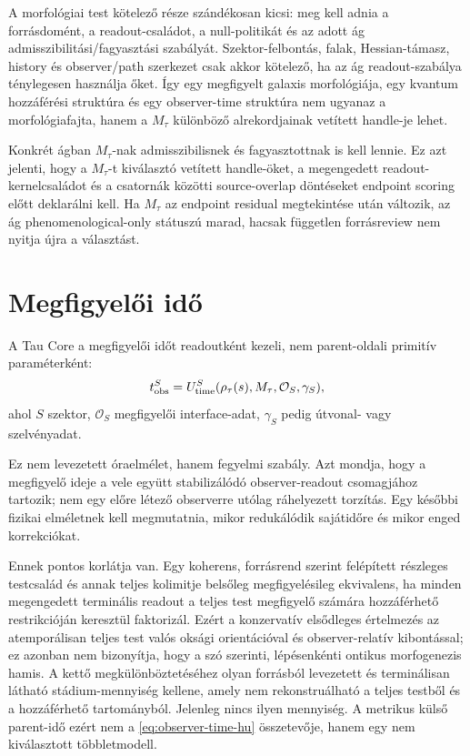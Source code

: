 \documentclass[12pt]{article}
\newcommand{\Rmap}{\rho_{\tau}}
\newcommand{\Mta}{M_{\tau}}
\begin{document}
A morfológiai test kötelező része szándékosan kicsi: meg kell adnia a
forrásdomént, a readout-családot, a null-politikát és az adott ág
admisszibilitási/fagyasztási szabályát.  Szektor-felbontás, falak,
Hessian-támasz, history és observer/path szerkezet csak akkor kötelező, ha az
ág readout-szabálya ténylegesen használja őket.  Így egy megfigyelt galaxis
morfológiája, egy kvantum hozzáférési struktúra és egy observer-time struktúra
nem ugyanaz a morfológiafajta, hanem a \(\Mta\) különböző alrekordjainak
vetített handle-je lehet.

Konkrét ágban \(\Mta\)-nak admisszibilisnek és fagyasztottnak is kell lennie.
Ez azt jelenti, hogy a \(\Mta\)-t kiválasztó vetített handle-öket, a megengedett
readout-kernelcsaládot és a csatornák közötti source-overlap döntéseket
endpoint scoring előtt deklarálni kell.  Ha \(\Mta\) az endpoint residual
megtekintése után változik, az ág phenomenological-only státuszú marad, hacsak
független forrásreview nem nyitja újra a választást.

\section{Megfigyelői idő}

A Tau Core a megfigyelői időt readoutként kezeli, nem parent-oldali primitív
paraméterként:
\begin{equation}
  t_{\rm obs}^{S}
  =
  U_{\rm time}^{S}(\Rmap(s),\Mta,\mathcal O_S,\gamma_S),
  \label{eq:observer-time-hu}
\end{equation}
ahol \(S\) szektor, \(\mathcal O_S\) megfigyelői interface-adat, \(\gamma_S\)
pedig útvonal- vagy szelvényadat.

Ez nem levezetett óraelmélet, hanem fegyelmi szabály.  Azt mondja, hogy a
megfigyelő ideje a vele együtt stabilizálódó observer-readout csomagjához
tartozik; nem egy előre létező observerre utólag ráhelyezett torzítás. Egy későbbi
fizikai elméletnek kell megmutatnia, mikor redukálódik sajátidőre és mikor
enged korrekciókat.

Ennek pontos korlátja van. Egy koherens, forrásrend szerint felépített részleges
testcsalád és annak teljes kolimitje belsőleg megfigyelésileg ekvivalens, ha
minden megengedett terminális readout a teljes test megfigyelő számára
hozzáférhető restrikcióján keresztül faktorizál. Ezért a konzervatív elsődleges
értelmezés az atemporálisan teljes test valós oksági orientációval és
observer-relatív kibontással; ez azonban nem bizonyítja, hogy a szó szerinti,
lépésenkénti ontikus morfogenezis hamis. A kettő megkülönböztetéséhez olyan
forrásból levezetett és terminálisan látható stádium-mennyiség kellene, amely
nem rekonstruálható a teljes testből és a hozzáférhető tartományból. Jelenleg
nincs ilyen mennyiség. A metrikus külső parent-idő ezért nem a
\eqref{eq:observer-time-hu} összetevője, hanem egy nem kiválasztott többletmodell.
\end{document}

